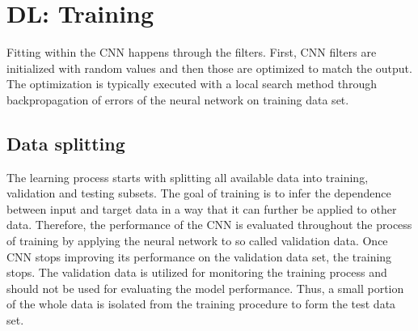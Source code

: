 \documentclass[paper,twocolomn]{geophysics}
\begin{document}






\section{DL: Training}
Fitting within the CNN happens through the filters. First, CNN filters are initialized with random values and then those are optimized to match the output. The optimization is typically executed with a local search method through backpropagation of errors of the neural network on training data set. 

\subsection{Data splitting}
The learning process starts with splitting all available data into training, validation and testing subsets. 
The goal of training is
to infer the dependence between input and target data in a way that it can further be applied to other data. Therefore, the performance of the CNN is evaluated throughout the process of training by applying the neural network to so called validation data. Once CNN stops improving its performance on the validation data set, the training stops. The validation data is utilized for monitoring the training process and should not be used for evaluating the model performance.   Thus, a small portion of the whole data is isolated from the training procedure to form the test data set. 
\end{document}
